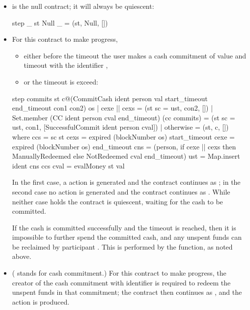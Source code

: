 \documentclass[runningheads]{llncs}
\begin{document}
\begin{itemize} 

\item {} is the null contract; it will always be quiescent:

\smallskip
\begin{haskellcode}
step _ st Null _ = (st, Null, [])
\end{haskellcode}
\smallskip

\item {}  For this contract to make progress,\begin{itemize}
\item either before the timeout  the user  makes a cash commitment of value 
 and timeout   with the identifier , 
\item
or the timeout  is exceed:
\end{itemize} 

\smallskip
\begin{haskellcode}
step 
  commits 
  st 
  c@(CommitCash ident person val start_timeout end_timeout con1 con2) 
  os
  | cexe || cexs = (st {sc = ust}, con2, [])
  | Set.member (CC ident person cval end_timeout) (cc commits)
        = (st {sc = ust}, con1, [SuccessfulCommit ident person cval])
  | otherwise = (st, c, [])
  where ccs = sc st
        cexs = expired (blockNumber os) start_timeout
        cexe = expired (blockNumber os) end_timeout
        cns = (person, if cexe || cexs 
                          then ManuallyRedeemed 
                          else NotRedeemed cval end_timeout)
        ust = Map.insert ident cns ccs
        cval = evalMoney st val
\end{haskellcode}
\smallskip
In the first case, a  action is generated and the contract continues as 
; in the second case no action is generated and the contract continues as 
. While neither case holds the contract is quiescent, waiting for the cash to be committed. 

If the cash is committed successfully and the timeout  is reached, then it is impossible to further 
spend the committed cash, and any unspent funds can be reclaimed by participant .
 This is performed by the  function, as noted above.

\item {} ( stands for cash commitment.) For this contract to make 
progress, the creator of the cash commitment with identifier  is required to redeem the unspent 
funds in that commitment; the contract then continues as , and the action 
 is produced. 


\end{itemize}
\end{document}
